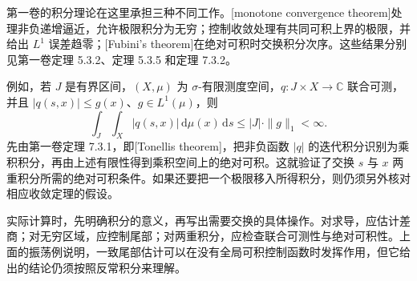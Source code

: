 第一卷的积分理论在这里承担三种不同工作。[monotone convergence theorem]处理非负递增逼近，允许极限积分为无穷；控制收敛处理有共同可积上界的极限，并给出 \(L^1\) 误差趋零；[Fubini's theorem]在绝对可积时交换积分次序。这些结果分别见第一卷定理 5.3.2、定理 5.3.5 和定理 7.3.2。

\ProseParagraphBreak

例如，若 \(J\) 是有界区间，\((X,\mu)\) 为 \(\sigma\)-有限测度空间，\(q:J\times X\to\mathbb C\) 联合可测，并且 \(|q(s,x)|\leq g(x)\)、\(g\in L^1(\mu)\)，则
\[
\int_J\int_X|q(s,x)|\,\mathrm{d}\mu(x)\,\mathrm{d}s
\leq |J|\cdot\|g\|_1<\infty.
\]
先由第一卷定理 7.3.1，即[Tonelli\textquotesingle s theorem]，把非负函数 \(|q|\) 的迭代积分识别为乘积积分，再由上述有限性得到乘积空间上的绝对可积。这就验证了交换 \(s\) 与 \(x\) 两重积分所需的绝对可积条件。如果还要把一个极限移入所得积分，则仍须另外核对相应收敛定理的假设。

\ProseParagraphBreak

实际计算时，先明确积分的意义，再写出需要交换的具体操作。对求导，应估计差商；对无穷区域，应控制尾部；对两重积分，应检查联合可测性与绝对可积性。上面的振荡例说明，一致尾部估计可以在没有全局可积控制函数时发挥作用，但它给出的结论仍须按照反常积分来理解。

